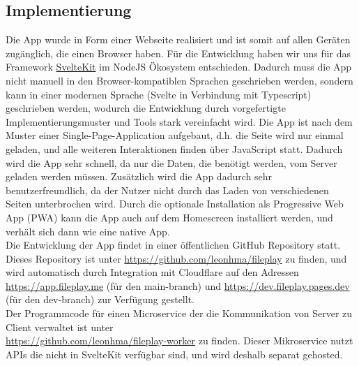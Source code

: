 \documentclass[a4paper]{article}
\begin{document}
\subsection{Implementierung}
Die App wurde in Form einer Webseite realisiert und ist somit auf allen Geräten
zugänglich, die einen Browser haben. Für die Entwicklung haben wir uns für das
Framework \href{https://kit.svelte.dev/}{SvelteKit} im NodeJS Ökosystem
entschieden. Dadurch muss die App nicht manuell in den Browser-kompatiblen
Sprachen geschrieben werden, sondern kann in einer modernen Sprache (Svelte in
Verbindung mit Typescript) geschrieben werden, wodurch die Entwicklung durch
vorgefertigte Implementierungsmuster und Tools stark vereinfacht wird. Die App
ist nach dem Muster einer Single-Page-Application aufgebaut, d.h. die Seite wird
nur einmal geladen, und alle weiteren Interaktionen finden über JavaScript
statt. Dadurch wird die App sehr schnell, da nur die Daten, die benötigt werden,
vom Server geladen werden müssen. Zusätzlich wird die App dadurch sehr
benutzerfreundlich, da der Nutzer nicht durch das Laden von verschiedenen Seiten
unterbrochen wird. Durch die optionale Installation als Progressive Web App
(PWA) kann die App auch auf dem Homescreen installiert werden, und verhält sich
dann wie eine native App.\\
Die Entwicklung der App findet in einer öffentlichen GitHub Repository statt.
Dieses Repository ist unter \url{https://github.com/leonhma/fileplay} zu finden,
und wird automatisch durch Integration mit Cloudflare auf den Adressen
\url{https://app.fileplay.me} (für den {main}-branch) und
\url{https://dev.fileplay.pages.dev} (für den {dev}-branch) zur Verfügung
gestellt.\\
Der Programmcode für einen Microservice der die Kommunikation von Server zu
Client verwaltet ist unter \\\url{https://github.com/leonhma/fileplay-worker} zu
finden. Dieser Mikroservice nutzt APIs die nicht in SvelteKit verfügbar sind,
und wird deshalb separat gehosted.
\end{document}
